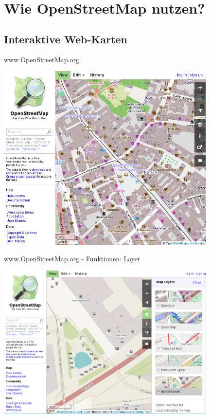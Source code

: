\documentclass{beamer}
\begin{document}
\section{Wie OpenStreetMap nutzen?}

\subsection{Interaktive Web-Karten}
\begin{frame}{ www.OpenStreetMap.org}

 \includegraphics[width=11cm]{mainpage.png}

\end{frame}

\begin{frame}{ www.OpenStreetMap.org - Funktionen: Layer}

 \includegraphics[width=11cm]{mainpage-layers.png}

\end{frame}
\end{document}
